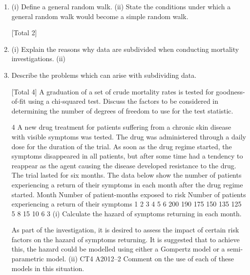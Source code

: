 \documentclass[a4paper,12pt]{article}
\begin{document}
\begin{enumerate}
\item %
(i) Define a general random walk.
(ii) State the conditions under which a general random walk would become a
simple random walk.

[Total 2]
\item %
(i) Explain the reasons why data are subdivided when conducting mortality
investigations.
(ii)

\item %

Describe the problems which can arise with subdividing data.


[Total 4]
A graduation of a set of crude mortality rates is tested for goodness-of-fit using a
chi-squared test.
Discuss the factors to be considered in determining the number of degrees of freedom
to use for the test statistic.

4
A new drug treatment for patients suffering from a chronic skin disease with visible
symptoms was tested. The drug was administered through a daily dose for the
duration of the trial. As soon as the drug regime started, the symptoms disappeared in
all patients, but after some time had a tendency to reappear as the agent causing the
disease developed resistance to the drug. The trial lasted for six months.
The data below show the number of patients experiencing a return of their symptoms
in each month after the drug regime started.
Month Number of patient-months
exposed to risk Number of patients experiencing
a return of their symptoms
1
2
3
4
5
6 200
190
175
150
135
125 5
8
15
10
6
3
(i)
Calculate the hazard of symptoms returning in each month.

As part of the investigation, it is desired to assess the impact of certain risk factors on
the hazard of symptoms returning. It is suggested that to achieve this, the hazard
could be modelled using either a Gompertz model or a semi-parametric model.
(ii)
CT4 A2012–2
Comment on the use of each of these models in this situation.
\end{enumerate}
\newpage
\end{document}
